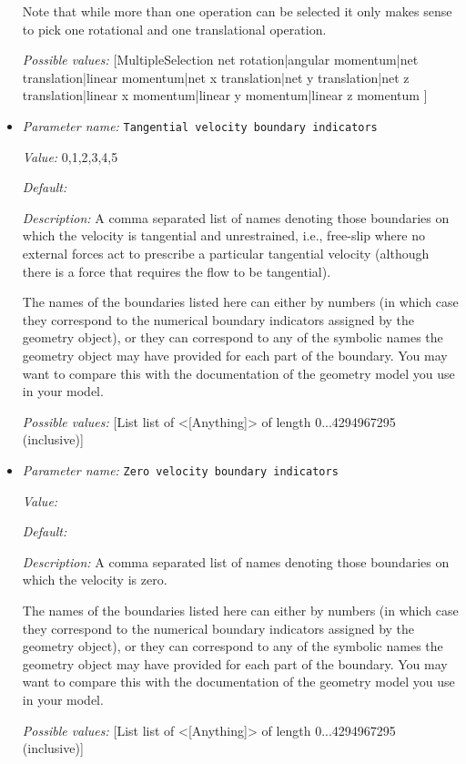 \begin{itemize}
Note that while more than one operation can be selected it only makes sense to pick one rotational and one translational operation.


{\it Possible values:} [MultipleSelection net rotation|angular momentum|net translation|linear momentum|net x translation|net y translation|net z translation|linear x momentum|linear y momentum|linear z momentum ]
\item {\it Parameter name:} {\tt Tangential velocity boundary indicators}
\label{parameters:Model settings/Tangential velocity boundary indicators}


{\it Value:} 0,1,2,3,4,5


{\it Default:} 


{\it Description:} A comma separated list of names denoting those boundaries on which the velocity is tangential and unrestrained, i.e., free-slip where no external forces act to prescribe a particular tangential velocity (although there is a force that requires the flow to be tangential).

The names of the boundaries listed here can either by numbers (in which case they correspond to the numerical boundary indicators assigned by the geometry object), or they can correspond to any of the symbolic names the geometry object may have provided for each part of the boundary. You may want to compare this with the documentation of the geometry model you use in your model.


{\it Possible values:} [List list of <[Anything]> of length 0...4294967295 (inclusive)]
\item {\it Parameter name:} {\tt Zero velocity boundary indicators}
\label{parameters:Model settings/Zero velocity boundary indicators}


{\it Value:} 


{\it Default:} 


{\it Description:} A comma separated list of names denoting those boundaries on which the velocity is zero.

The names of the boundaries listed here can either by numbers (in which case they correspond to the numerical boundary indicators assigned by the geometry object), or they can correspond to any of the symbolic names the geometry object may have provided for each part of the boundary. You may want to compare this with the documentation of the geometry model you use in your model.


{\it Possible values:} [List list of <[Anything]> of length 0...4294967295 (inclusive)]
\end{itemize}

